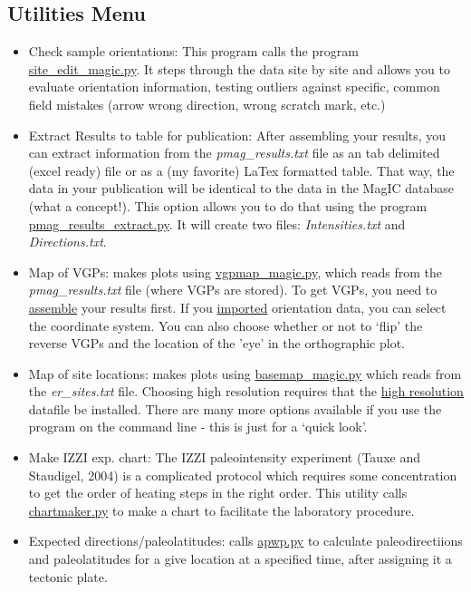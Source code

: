 \documentclass[11pt]{book}
\begin{document}
{
\subsection{Utilities Menu}

\begin{itemize}
		\item Check sample orientations:  This program calls the program \href{#site_edit_magic.py}{site\_edit\_magic.py}.  It steps through the data site by site and allows you to evaluate orientation information, testing outliers against specific, common field mistakes (arrow wrong direction, wrong scratch mark, etc.) 
		\item Extract Results to table for publication:  After assembling your results, you can extract information from the {\it pmag\_results.txt} file as an tab delimited (excel ready) file or as a (my favorite) LaTex formatted table.  That way, the data in your publication will be identical to the data in the MagIC database (what a concept!).  This option allows you to do that using the program \href{#pmag_results_extract.py}{pmag\_results\_extract.py}.  It will create two files:  {\it Intensities.txt} and {\it Directions.txt}.  
		\item Map of VGPs:  makes plots using \href{#vgpmap_magic.py}{vgpmap\_magic.py}, which reads from the {\it pmag\_results.txt} file (where VGPs are stored).  To get VGPs, you need to \href{#AssembleResults}{assemble} your results first.   If you \href{#ImportMenu}{imported} orientation data, you can select the coordinate system.  You can also choose whether or not to `flip' the reverse VGPs and the location of the 'eye' in the orthographic plot.  
		\item Map of site locations: makes plots using \href{#basemap_magic.py}{basemap\_magic.py} which reads from the {\it er\_sites.txt} file.  Choosing high resolution requires that the    \href{http://earthref.org/PmagPy/hires.html}{high resolution} datafile be installed.  There are many more options available if you use the program on the command line - this is just for a `quick look'.

\item Make IZZI exp. chart: The IZZI paleointensity experiment (Tauxe and Staudigel, 2004) \nocite{tauxe04} is a complicated protocol which requires some concentration to get the order of heating steps in the right order.  This utility calls \href{#chartmaker.py}{chartmaker.py} to make a chart to facilitate the laboratory procedure.  
\item Expected directions/paleolatitudes:  calls \href{#apwp.py}{apwp.py} to calculate paleodirectiions and paleolatitudes for a give location at a specified time, after assigning it a tectonic plate.  
\end{itemize}

}
\end{document}
